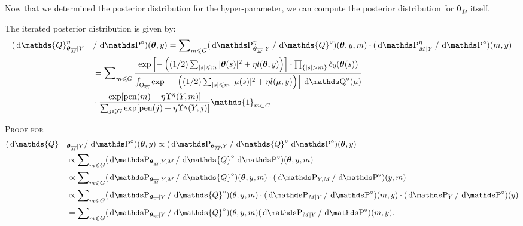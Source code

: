 Now that we determined the posterior distribution for the hyper-parameter, we can compute the posterior distribution for $\boldsymbol{\theta}_{\overline{M}}$ itself.

\begin{pr}\label{PR_BAYES_HIERARCHICAL_ITER}
The iterated posterior distribution is given by:
\begin{alignat*}{2}
&(\d\mathds{Q}_{\boldsymbol{\theta}_{\overline{M}} \vert Y}^{\eta} && /\d\P^{\circ})(\boldsymbol{\theta}, y) = \sum\nolimits_{m \leq G} (\d\P_{\boldsymbol{\theta}_{\overline{M}} \vert Y}^{\eta}/\d\mathds{Q}^{\circ})(\boldsymbol{\theta}, y, m) \cdot (\d\P_{M \vert Y}^{\eta}/\d\P^{\circ})(m, y)\\
& && = \sum\nolimits_{m \leq G} \frac{\exp\left[-\left((1/2)\sum\nolimits_{\vert s \vert \leq m} \vert \boldsymbol{\theta}(s) \vert^{2} + \eta l(\boldsymbol{\theta}, y)\right)\right] \cdot \prod\nolimits_{ \{ \vert s \vert > m \} } \delta_{0}(\boldsymbol{\theta}(s))}{\int_{\Theta_{\overline{m}}} \exp\left[-\left((1/2)\sum\nolimits_{\vert s \vert \leq m} \vert \mu(s) \vert^{2} + \eta l(\mu, y)\right)\right] \d\Q^{\circ}(\mu)}\\
& && \cdot \frac{\exp[\pen(m) + \eta \Upsilon^{\eta}(Y, m)]}{\sum\nolimits_{j \leq G}\exp[\pen(j) + \eta \Upsilon^{\eta}(Y, j)]} \mathds{1}_{m \subset G}
\end{alignat*}
\reEnd
\end{pr}

\begin{pro}{\textsc{Proof for  \\}}\label{PRO_BAYES_HIERARCHICAL_ITER}
\begin{alignat*}{2}
&(\d\mathds{Q}&&_{\boldsymbol{\theta}_{\overline{M}} \vert Y}/\d\P^{\circ})(\boldsymbol{\theta}, y) \propto (\d\P_{\boldsymbol{\theta}_{\overline{M}}, Y}/\d\mathds{Q}^{\circ} \d\P^{\circ})(\boldsymbol{\theta}, y)\\
& &&\propto \sum\nolimits_{m \leq G} (\d\P_{\boldsymbol{\theta}_{\overline{M}}, Y, M}/\d\mathds{Q}^{\circ} \d\P^{\circ})(\boldsymbol{\theta}, y, m)\\
& &&\propto \sum\nolimits_{m \leq G} (\d\P_{\boldsymbol{\theta}_{\overline{M}} \vert Y, M}/\d\mathds{Q}^{\circ})(\boldsymbol{\theta}, y, m) \cdot (\d\P_{Y, M}/\d\P^{\circ})(y, m)\\
& &&\propto \sum\nolimits_{m \leq G} (\d\P_{\boldsymbol{\theta}_{\overline{m}} \vert Y}/\d\mathds{Q}^{\circ})(\theta, y, m) \cdot (\d\P_{M \vert Y}/\d\P^{\circ})(m, y) \cdot (\d\P_{Y}/\d\P^{\circ})(y)\\
& &&= \sum\nolimits_{m \leq G} (\d\P_{\boldsymbol{\theta}_{\overline{m}} \vert Y}/\d\mathds{Q}^{\circ})(\theta, y, m) (\d\P_{M \vert Y}/\d\P^{\circ})(m, y).
\end{alignat*}
\proEnd
\end{pro}

